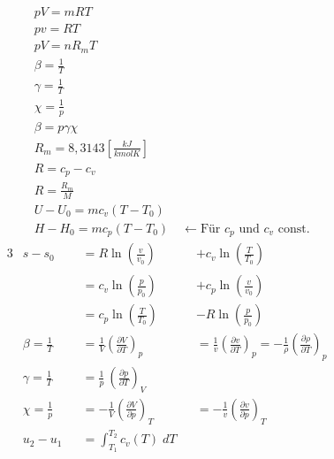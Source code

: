 \documentclass[twocolumn]{article}
\begin{document}
\begin{align*}
	&pV = mRT \\ 
	&pv = RT \\
	&pV = nR_mT \\
	&\beta = \frac{1}{T} \\
	&\gamma = \frac{1}{T} \\
	&\chi = \frac{1}{p} \\
	&\beta = p \gamma \chi\\
	&R_m = 8,3143\left[\frac{kJ}{kmolK}\right] \\
	&R = c_p - c_v\\
	&R = \frac{R_m}{M}
	\\
	&U - U_0 = mc_v(T-T_0)
	\\
	&H - H_0 = mc_p(T-T_0) \quad \leftarrow \text{Für $c_p$ und $c_v$ const.}
\end{align*}
\begin{alignat*}{3}
	&s - s_0 
	&&= R \ln \left(\frac{ v}{ v_0}\right)_{} 
	&&+ c_v \ln \left(\frac{ T}{ T_0}\right)_{}
	\\
	& 
	&&= c_v \ln \left( \frac{p}{p_0} \right) 
	&&+ c_p \ln \left( \frac{v}{v_0} \right)
	\\
	& 
	&&= c_p \ln \left( \frac{T}{T_0} \right) 
	&&-R \ln \left( \frac{p}{p_0} \right)
	\\
	&\beta 
	= \frac{1}{T} 
	&&=\frac{1}{V}\left(\frac{\partial V}{\partial T}\right)_{p} 
	&&=  \frac{1}{v}\left(\frac{\partial v}{\partial T}\right)_{p} 
	=  - \frac{1}{\rho}\left(\frac{\partial \rho}{\partial T}\right)_{p} 
	\\
	&\gamma 
	= \frac{1}{T}  
	&&= \frac{1}{p} \: \left(\frac{\partial p}{\partial T}\right)_{V}
	\\
	&\chi 
	= \frac{1}{p} 
	&&= - \frac{1}{V}\left(\frac{\partial V}{\partial p}\right)_{T}  
	&&= - \frac{1}{v}\left(\frac{\partial v}{\partial p}\right)_{T}
	\\
		& u_2 - u_1 &&= \int_{T_1}^{T_2} c_v(T)\; dT
	\\
\end{alignat*}
                                                                          
\end{document}
